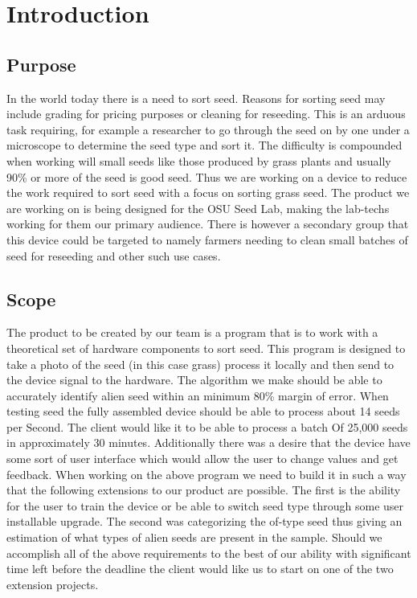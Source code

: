 \documentclass[onecolumn, draftclsnofoot,10pt, compsoc]{IEEEtran}
\begin{document}

\section{Introduction}

\subsection{Purpose}
In the world today there is a need to sort seed.
Reasons for sorting seed may include grading for pricing purposes or cleaning for reseeding.
This is an arduous task requiring, for example a researcher to go through the seed on by one under a microscope to determine the seed type and sort it.
The difficulty is compounded when working will small seeds like those produced by grass plants and usually 90\% or more of the seed is good seed.
Thus we are working on a device to reduce the work required to sort seed with a focus on sorting grass seed.
The product we are working on is being designed for the OSU Seed Lab, making the lab-techs working for them our primary audience.
There is however a secondary group that this device could be targeted to namely farmers needing to clean small batches of seed for reseeding and other such use cases.

\subsection{Scope}
The product to be created by our team is a program that is to work with a theoretical set of hardware components to sort seed.
This program is designed to take a photo of the seed (in this case grass) process it locally and then send to the device signal to the hardware.
The algorithm we make should be able to accurately identify alien seed within an minimum 80\% margin of error.
When testing seed the fully assembled device should be able to process about 14 seeds per Second.
The client would like it to be able to process a batch Of 25,000 seeds in approximately 30 minutes.
Additionally there was a desire that the device have some sort of user interface which would allow the user to change values and get feedback.
When working on the above program we need to build it in such a way that the following extensions to our product are possible.
The first is the ability for the user to train the device or be able to switch seed type through some user installable upgrade.
The second was categorizing the of-type seed thus giving an estimation of what types of alien seeds are present in the sample.
Should we accomplish all of the above requirements to the best of our ability with significant time left before the deadline the client would like us to start on one of the two extension projects.
\end{document}
